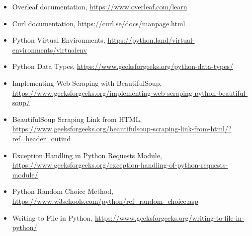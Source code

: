 \documentclass[12pt]{article}
\begin{document}
\begin{itemize}
    \item {Overleaf documentation, \url{https://www.overleaf.com/learn}}
    \item {Curl documentation, \url{https://curl.se/docs/manpage.html}}
    \item {Python Virtual Environments, \url{https://python.land/virtual-environments/virtualenv}}
    \item{Python Data Types, \url{https://www.geeksforgeeks.org/python-data-types/}}
    \item{Implementing Web Scraping with BeautifulSoup, \url{https://www.geeksforgeeks.org/implementing-web-scraping-python-beautiful-soup/}}
    \item{BeautifulSoup Scraping Link from HTML, \url{https://www.geeksforgeeks.org/beautifulsoup-scraping-link-from-html/?ref=header_outind}}
    \item{Exception Handling in Python Requests Module, \url{https://www.geeksforgeeks.org/exception-handling-of-python-requests-module/}}
    \item{Python Random Choice Method, \url{https://www.w3schools.com/python/ref_random_choice.asp}}
    \item{Writing to File in Python, \url{https://www.geeksforgeeks.org/writing-to-file-in-python/}}
\end{itemize}
\end{document}
